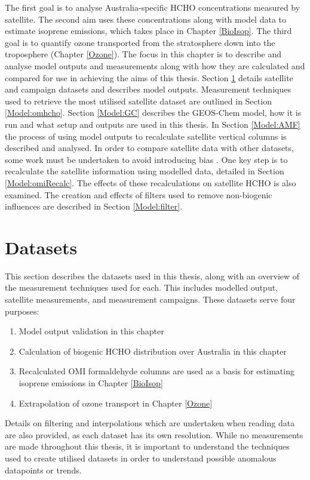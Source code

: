   The first goal is to analyse Australia-specific HCHO concentrations measured by satellite.
  The second aim uses these concentrations along with model data to estimate isoprene emissions, which takes place in Chapter \ref{BioIsop}.
  The third goal is to quantify ozone transported from the stratosphere down into the troposphere (Chapter \ref{Ozone}).
  The focus in this chapter is to describe and analyse model outputs and measurements along with how they are calculated and compared for use in achieving the aims of this thesis.
  Section \ref{Model:datasets} details satellite and campaign datasets and describes model outputs.
  Measurement techniques used to retrieve the most utilised satellite dataset are outlined in Section \ref{Model:omhcho}.
  Section \ref{Model:GC} describes the GEOS-Chem model, how it is run and what setup and outputs are used in this thesis.
  In Section \ref{Model:AMF} the process of using model outputs to recalculate satellite vertical columns is described and analysed.
  In order to compare satellite data with other datasets, some work must be undertaken to avoid introducing bias \parencite[e.g.,][]{Palmer2001, Eskes2003, Marais2012, Lamsal2014}.
  One key step is to recalculate the satellite information using modelled data, detailed in Section \ref{Model:omiRecalc}.
  The effects of these recalculations on satellite HCHO is also examined.
  The creation and effects of filters used to remove non-biogenic influences are described in Section \ref{Model:filter}.
  
  

\section{Datasets}
  \label{Model:datasets}
  
  This section describes the datasets used in this thesis, along with an overview of the measurement techniques used for each.
  This includes modelled output, satellite measurements, and measurement campaigns.
  These datasets serve four purposes: 
  \begin{enumerate}
    \item Model output validation in this chapter
    \item Calculation of biogenic HCHO distribution over Australia in this chapter
    \item Recalculated OMI formaldehyde columns are used as a basis for estimating isoprene emissions in Chapter \ref{BioIsop}
    \item Extrapolation of ozone transport in Chapter \ref{Ozone}
  \end{enumerate}
  Details on filtering and interpolations which are undertaken when reading data are also provided, as each dataset has its own resolution.
  While no measurements are made throughout this thesis, it is important to understand the techniques used to create utilised datasets in order to understand possible anomalous datapoints or trends.
  
